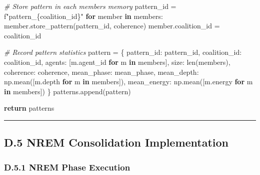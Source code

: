 \documentclass[
]{article}
\newenvironment{Shaded}{}{}
\newcommand{\BuiltInTok}[1]{\textcolor[rgb]{0.00,0.50,0.00}{#1}}
\newcommand{\CommentTok}[1]{\textcolor[rgb]{0.38,0.63,0.69}{\textit{#1}}}
\newcommand{\ControlFlowTok}[1]{\textcolor[rgb]{0.00,0.44,0.13}{\textbf{#1}}}
\newcommand{\KeywordTok}[1]{\textcolor[rgb]{0.00,0.44,0.13}{\textbf{#1}}}
\newcommand{\NormalTok}[1]{#1}
\newcommand{\OperatorTok}[1]{\textcolor[rgb]{0.40,0.40,0.40}{#1}}
\newcommand{\SpecialCharTok}[1]{\textcolor[rgb]{0.25,0.44,0.63}{#1}}
\newcommand{\SpecialStringTok}[1]{\textcolor[rgb]{0.73,0.40,0.53}{#1}}
\newcommand{\StringTok}[1]{\textcolor[rgb]{0.25,0.44,0.63}{#1}}
\begin{document}
\begin{Shaded}
\begin{Highlighting}[]
        \CommentTok{\# Store pattern in each member\textquotesingle{}s memory}
\NormalTok{        pattern\_id }\OperatorTok{=} \SpecialStringTok{f"pattern\_}\SpecialCharTok{\{}\NormalTok{coalition\_id}\SpecialCharTok{\}}\SpecialStringTok{"}
        \ControlFlowTok{for}\NormalTok{ member }\KeywordTok{in}\NormalTok{ members:}
\NormalTok{            member.store\_pattern(pattern\_id, coherence)}
\NormalTok{            member.coalition\_id }\OperatorTok{=}\NormalTok{ coalition\_id}

        \CommentTok{\# Record pattern statistics}
\NormalTok{        pattern }\OperatorTok{=}\NormalTok{ \{}
            \StringTok{\textquotesingle{}pattern\_id\textquotesingle{}}\NormalTok{: pattern\_id,}
            \StringTok{\textquotesingle{}coalition\_id\textquotesingle{}}\NormalTok{: coalition\_id,}
            \StringTok{\textquotesingle{}agents\textquotesingle{}}\NormalTok{: [m.agent\_id }\ControlFlowTok{for}\NormalTok{ m }\KeywordTok{in}\NormalTok{ members],}
            \StringTok{\textquotesingle{}size\textquotesingle{}}\NormalTok{: }\BuiltInTok{len}\NormalTok{(members),}
            \StringTok{\textquotesingle{}coherence\textquotesingle{}}\NormalTok{: coherence,}
            \StringTok{\textquotesingle{}mean\_phase\textquotesingle{}}\NormalTok{: mean\_phase,}
            \StringTok{\textquotesingle{}mean\_depth\textquotesingle{}}\NormalTok{: np.mean([m.depth }\ControlFlowTok{for}\NormalTok{ m }\KeywordTok{in}\NormalTok{ members]),}
            \StringTok{\textquotesingle{}mean\_energy\textquotesingle{}}\NormalTok{: np.mean([m.energy }\ControlFlowTok{for}\NormalTok{ m }\KeywordTok{in}\NormalTok{ members])}
\NormalTok{        \}}
\NormalTok{        patterns.append(pattern)}

    \ControlFlowTok{return}\NormalTok{ patterns}
\end{Highlighting}
\end{Shaded}

\begin{center}\rule{0.5\linewidth}{0.5pt}\end{center}

\subsection{D.5 NREM Consolidation
Implementation}\label{d.5-nrem-consolidation-implementation}

\subsubsection{D.5.1 NREM Phase
Execution}\label{d.5.1-nrem-phase-execution}
\end{document}
